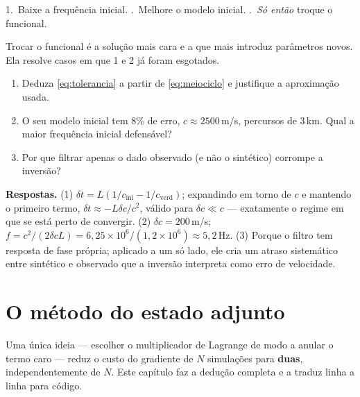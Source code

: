 \documentclass[11pt,a4paper,oneside]{report}
\begin{document}

\begin{pratica}
1.~Baixe a frequ\^encia inicial. .~Melhore o modelo inicial. .~\emph{S\'o ent\~ao} troque o funcional.

Trocar o funcional \'e a solu\c{c}\~ao mais cara e a que mais introduz
par\^ametros novos. Ela resolve casos em que 1 e 2 j\'a foram esgotados.
\end{pratica}

\begin{exercicio}
\begin{enumerate}[leftmargin=*, itemsep=2pt]
\item Deduza \eqref{eq:tolerancia} a partir de \eqref{eq:meiociclo} e
justifique a aproxima\c{c}\~ao usada.
\item O seu modelo inicial tem $8\%$ de erro, $c \approx 2500$\,m/s, percursos
de 3\,km. Qual a maior frequ\^encia inicial defens\'avel?
\item Por que filtrar apenas o dado observado (e n\~ao o sint\'etico)
corrompe a invers\~ao?
\end{enumerate}
\textbf{Respostas.} (1) $\delta t = L(1/c_{\text{ini}} - 1/c_{\text{verd}})$;
expandindo em torno de $c$ e mantendo o primeiro termo,
$\delta t \approx -L\delta c/c^{2}$, v\'alido para $\delta c \ll c$ ---
exatamente o regime em que se est\'a perto de convergir. (2) $\delta c = 200$\,m/s;
$f = c^{2}/(2\delta c L) = 6{,}25\times10^{6}/(1{,}2\times10^{6}) \approx
5{,}2$\,Hz. (3) Porque o filtro tem resposta de fase pr\'opria; aplicado a um
s\'o lado, ele cria um atraso sistem\'atico entre sint\'etico e observado que
a invers\~ao interpreta como erro de velocidade.
\end{exercicio}

\chapter{O m\'etodo do estado adjunto}
\label{cap:adjunto}

\begin{ideia}
Uma \'unica ideia --- escolher o multiplicador de Lagrange de modo a anular o
termo caro --- reduz o custo do gradiente de $N$ simula\c{c}\~oes para
\textbf{duas}, independentemente de $N$. Este cap\'itulo faz a dedu\c{c}\~ao
completa e a traduz linha a linha para c\'odigo.
\end{ideia}
\end{document}
